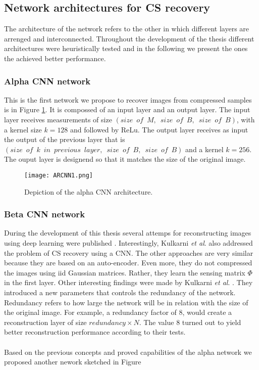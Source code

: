 \subsection{Network architectures for CS recovery}
The architecture of the network refers to the other in which different layers are arrenged and interconnected. Throughout the development of the thesis different architectures were heuristically tested and in the following we present the ones the achieved better performance.
\subsubsection{Alpha CNN network}
This is the first network we propose to recover images from compressed samples is in Figure \ref{fig:ARCNNim1}. It is compossed of an input layer and an output layer. The input layer receives measurements of size $(size \enspace of \enspace M ,\enspace size \enspace of \enspace B , \enspace size \enspace of \enspace B)$, with a kernel size $k=128$ and followed by ReLu. The output layer receives as input the output of the previous layer that is $(size \enspace of \enspace k \enspace in \enspace previous \enspace layer ,\enspace size \enspace of \enspace B , \enspace size \enspace of \enspace B)$ and a kernel $k=256$. The ouput layer is designend so that it matches the size of the original image.  
\begin{figure}[tb] 
\centering 
\texttt{[image: ARCNN1.png]} 
\caption[Alpha CNN architecture for recovery ]{Depiction of the alpha CNN architecture.}
\label{fig:ARCNNim1} 
\end{figure}

\subsubsection{Beta CNN network}
During the development of this thesis several attemps for reconstructing images using deep learning were published \cite{kulkarni2016reconnet,mousavi2015deep,iliadis2016deep,iliadis2016deepbinarymask,adler2016deep}. Interestingly, Kulkarni \textit{et al}. \cite{kulkarni2016reconnet} also addressed the problem of CS recovery using a CNN. The other approaches are very similar because they are based on an auto-encoder.  Even more, they do not compressed the images using iid Gaussian matrices. Rather, they learn the sensing matrix $\Phi$ in the first layer. Other interesting findings were made by Kulkarni \textit{et al}. \cite{kulkarni2016reconnet}. They introduced a new parameters that controls the redundancy of the network. Redundancy refers to how large the network will be in relation with the size of the original image. For example, a redundancy factor of 8, would create a reconstruction layer of size $redundancy \times N$. The value 8 turned out to yield better reconstruction performance according to their tests.\\\\
Based on the previous concepts and proved capabilities of the alpha network we proposed another nework sketched in Figure %


